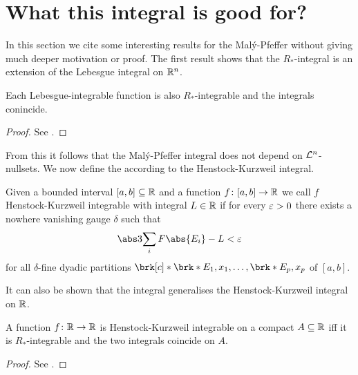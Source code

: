 \section{What this integral is good for?}

In this section we cite some interesting results for the Malý-Pfeffer without giving much deeper motivation or proof. The first result shows that the $R_*$-integral is an extension of the Lebesgue integral on $\mathbb{R}^n$.

\begin{proposition}
Each Lebesgue-integrable function is also $R_*$-integrable and the integrals conincide.
\end{proposition}
\begin{proof}
See \cite[Proposition 3.5]{Pfe2016}.
\end{proof}

\noindent
From this it follows that the Malý-Pfeffer integral does not depend on $\mathcal{L}^n$-nullsets. We now define the according to \cite[Appendix H]{Coh2013} the Henstock-Kurzweil integral.

\begin{definition}
Given a bounded  interval $[a,b]\subseteq\mathbb{R}$ and a function $f\colon[a,b]\to\mathbb{R}$ we call $f$ Henstock-Kurzweil integrable with integral $L\in\mathbb{R}$ if for every $\varepsilon>0$ there exists a nowhere vanishing gauge $\delta$ such that
\begin{align*}
	\abs3{\sum_iF\abs{E_i}-L}<\e
\end{align*}
for all $\delta$-fine dyadic partitions $\brk[c]*{\brk*{E_1,x_1},\dots,\brk*{E_p,x_p}}$ of $[a,b]$.
\end{definition}

It can also be shown that the integral generalises the Henstock-Kurzweil integral on $\mathbb{R}$. 

\begin{proposition}
A function $f\colon\mathbb{R}\to\mathbb{R}$ is Henstock-Kurzweil integrable on a compact $A\subseteq\mathbb{R}$ iff it is $R_*$-integrable and the two integrals coincide on $A$.
\end{proposition}
\begin{proof}
See \cite[Proposition 3.6]{Pfe2016}.
\end{proof}

